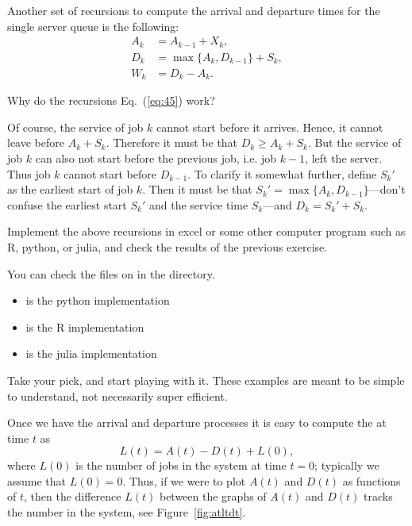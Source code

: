 Another set of recursions to compute the arrival and departure times for the single server queue is the following:
\begin{equation}
  \label{eq:45}
  \begin{split}
    A_k &= A_{k-1} + X_k, \\
    D_k &= \max\{A_k, D_{k-1}\} + S_k,\\
    W_k &= D_k - A_k.
  \end{split}
\end{equation}

\begin{exercise}  Why do the recursions Eq.~(\ref{eq:45}) work? 
  \begin{solution}
 Of course, the service of job $k$ cannot start before it
      arrives. Hence, it cannot leave before $A_k + S_k$. Therefore it
      must be that $D_k \geq A_k +S_k$. But the service of job $k$ can
      also not start before the previous job, i.e. job $k-1$, left the
      server. Thus job $k$ cannot start before $D_{k-1}$. To clarify
      it somewhat further, define $S_k'$ as the earliest start of job
      $k$. Then it must be that $S_k' = \max\{A_k, D_{k-1}\}$---don't
      confuse the earliest start $S_k'$ and the service time
      $S_k$---and $D_k = S_k' + S_k$.
    \end{solution}
\end{exercise}

\begin{exercise}
  Implement the above recursions in excel or some other computer
  program such as R, python, or julia, and check the results of the
  previous exercise.
    \begin{solution}
      You can check the files on  in the 
      directory.
\begin{itemize}
\item {} is the python implementation
\item {} is the R implementation
\item {} is the julia implementation
\end{itemize}
Take your pick, and start playing with it. These examples are meant to
be simple to understand, not necessarily super efficient.
\end{solution}
\end{exercise}

Once we have the arrival and departure processes it is easy to compute
the  at time $t$ as
\begin{equation}\label{eq:14}
  L(t) = A(t) - D(t) + L(0),
\end{equation}
where $L(0)$ is the number of jobs in the system at time $t=0$;
typically we assume that $L(0)=0$. Thus, if we were to plot $A(t)$ and
$D(t)$ as functions of $t$, then the difference $L(t)$ between the
graphs of $A(t)$ and $D(t)$ tracks the number in the system, see
Figure~\ref{fig:atltdt}. 



